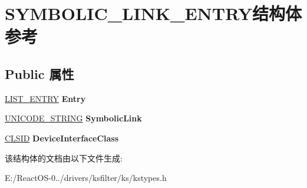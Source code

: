 \hypertarget{struct_s_y_m_b_o_l_i_c___l_i_n_k___e_n_t_r_y}{}\section{S\+Y\+M\+B\+O\+L\+I\+C\+\_\+\+L\+I\+N\+K\+\_\+\+E\+N\+T\+R\+Y结构体 参考}
\label{struct_s_y_m_b_o_l_i_c___l_i_n_k___e_n_t_r_y}
\subsection*{Public 属性}
\begin{DoxyCompactItemize}
\item 
\mbox{\label{struct_s_y_m_b_o_l_i_c___l_i_n_k___e_n_t_r_y_a526da0fb0b9817a8de5e7b63f67bfc3c}} 
\hyperlink{struct___l_i_s_t___e_n_t_r_y}{L\+I\+S\+T\+\_\+\+E\+N\+T\+RY} {\bfseries Entry}
\item 
\mbox{\label{struct_s_y_m_b_o_l_i_c___l_i_n_k___e_n_t_r_y_a8fe9ec80e7e3db2340f98a0895cfd4a2}} 
\hyperlink{struct___u_n_i_c_o_d_e___s_t_r_i_n_g}{U\+N\+I\+C\+O\+D\+E\+\_\+\+S\+T\+R\+I\+NG} {\bfseries Symbolic\+Link}
\item 
\mbox{\label{struct_s_y_m_b_o_l_i_c___l_i_n_k___e_n_t_r_y_af55c14d6e9b130775a2445bd25c74ebe}} 
\hyperlink{struct___i_i_d}{C\+L\+S\+ID} {\bfseries Device\+Interface\+Class}
\end{DoxyCompactItemize}


该结构体的文档由以下文件生成\+:\begin{DoxyCompactItemize}
\item 
E\+:/\+React\+O\+S-\/0../drivers/ksfilter/ks/kstypes.\+h\end{DoxyCompactItemize}
